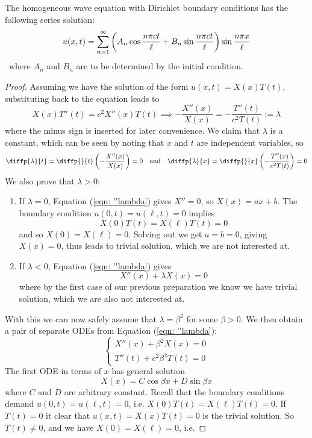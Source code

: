 \begin{thm}
    The homogeneous wave equation with Dirichlet boundary conditions has the following series solution:
    \[u(x,t) = \sum_{n=1}^\infty \left(A_n \cos \frac{n\pi ct}{\ell} + B_n \sin \frac{n\pi ct}{\ell}\right)\sin\frac{n\pi x}{\ell}\]\
    where $A_n$ and $B_n$ are to be determined by the initial condition.
\end{thm}
\begin{proof}
    Assuming we have the solution of the form $u(x,t) = X(x)T(t)$, substituting back to the equation leads to 
    \begin{equation}\label{eqn: ''lambda}
        X(x)T''(t) = c^2 X''(x)T(t) \implies -\frac{X''(x)}{X(x)} = -\frac{T''(t)}{c^2T(t)} := \lambda
    \end{equation}
    where the minus sign is inserted for later convenience. We claim that $\lambda$ is a constant, which can be seen by noting that $x$ and $t$ are independent variables, so 
    \[\diffp{\lambda}{t} = \diffp{}{t}\br{-\frac{X''(x)}{X(x)}} = 0 \qand \diffp{\lambda}{x} = \diffp{}{x}\br{-\frac{T''(x)}{c^2 T(t)}} = 0\]
    We also prove that $\lambda>0$:
    \begin{enumerate}
        \item If $\lambda = 0$, Equation (\ref{eqn: ''lambda}) gives $X''=0$, so $X(x) = ax + b$. The boundary condition $u(0,t) = u(\ell,t) = 0$ implies
        \[X(0)T(t) = X(\ell)T(t) = 0\]
        and so $X(0) = X(\ell) = 0$. Solving out we get $a=b=0$, giving $X(x) = 0$, thus leads to trivial solution, which we are not interested at.
        \item If $\lambda<0$, Equation (\ref{eqn: ''lambda}) gives
        \[X''(x) + \lambda X(x) = 0\]
        where by the first case of our previous preparation we know we have trivial solution, which we are also not interested at.
    \end{enumerate}
    With this we can now safely assume that $\lambda = \beta^2$ for some $\beta >0$. We thsu obtain a pair of separate ODEs from Equation (\ref{eqn: ''lambda}):
    \[\begin{cases}
        X''(x) + \beta^2 X(x) = 0\\
        T''(t) + c^2\beta^2 T(t) = 0
    \end{cases}\]
    The first ODE in terms of $x$ has general solution 
    \[X(x) = C\cos \beta x + D \sin \beta x\]
    where $C$ and $D$ are arbitrary constant. Recall that the boundary conditions demand $u(0,t) = u(\ell,t)=0$, i.e. $X(0)T(t)=X(\ell)T(t) = 0$. If $T(t)=0$ it clear that $u(x,t)=X(x)T(t) = 0$ is the trivial solution. So $T(t)\neq 0$, and we have $X(0) = X(\ell)=0$, i.e.

\end{proof}
